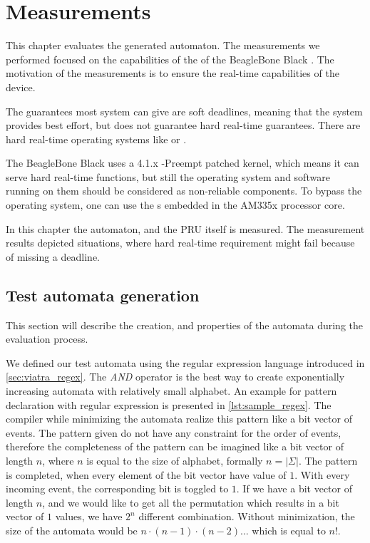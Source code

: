 
\chapter{Measurements}
\label{ch:measurements}

This chapter evaluates the generated automaton. The measurements we performed focused on the capabilities of the \pru{} of the BeagleBone Black \sbc{}. The motivation of the measurements is to ensure the real-time capabilities of the device.

The guarantees most system can give are soft deadlines, meaning that the system provides best effort, but does not guarantee hard real-time guarantees. There are hard real-time operating systems like  or .

The BeagleBone Black uses a 4.1.x -Preempt patched kernel, which means it can serve hard real-time functions, but still the operating system and software running on them should be considered as non-reliable components. To bypass the operating system, one can use the \pru{}s embedded in the AM335x processor core.

In this chapter the automaton, and the PRU itself is measured. The measurement results depicted situations, where hard real-time requirement might fail because of missing a deadline.

\section{Test automata generation}

This section will describe the creation, and properties of the automata during the evaluation process.

We defined our test automata using the regular expression language introduced in \ref{sec:viatra_regex}. The \emph{AND} operator is the best way to create exponentially increasing automata with relatively small alphabet. An example for pattern declaration with regular expression is presented in \cref{lst:sample_regex}.
The compiler while minimizing the automata realize this pattern like a bit vector of events. The pattern given do not have any constraint for the order of events, therefore the completeness of the pattern can be imagined like a bit vector of length $n$, where $n$ is equal to the size of alphabet, formally $n=|\Sigma|$. The pattern is completed, when every element of the bit vector have value of $1$.
With every incoming event, the corresponding bit is toggled to $1$. If we have a bit vector of length $n$, and we would like to get all the permutation which results in a bit vector of $1$ values, we have $2^n$ different combination. Without minimization, the size of the automata would be $n \cdot (n-1) \cdot (n-2) \ldots $ which is equal to $n!$.


